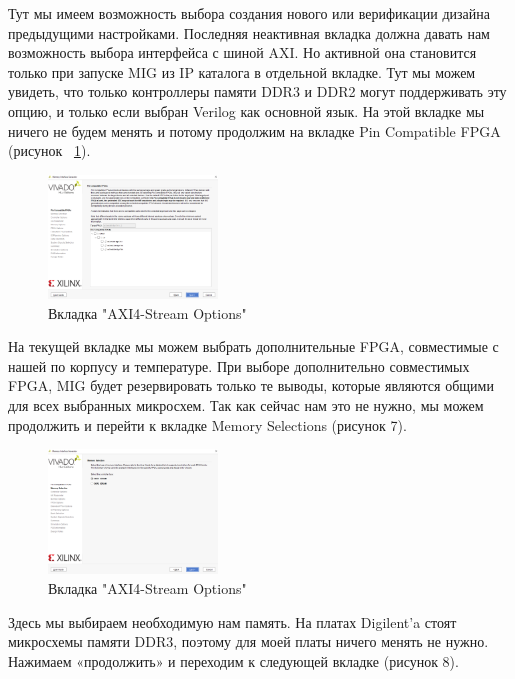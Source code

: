 \documentclass[a4paper,oneside ,10pt]{extreport}
\begin{document}
Тут мы имеем возможность выбора создания нового или верификации дизайна предыдущими настройками. Последняя неактивная вкладка должна давать нам возможность выбора интерфейса с шиной AXI. Но активной она становится только при запуске MIG из IP каталога в отдельной вкладке. Тут мы можем увидеть, что только контроллеры памяти DDR3 и DDR2 могут поддерживать эту опцию, и только если выбран Verilog как основной язык. На этой вкладке мы ничего не будем менять и потому продолжим на вкладке Pin Compatible FPGA (рисунок ~\ref{mig_2}).

\begin{figure}[h]
	\centering
	\includegraphics[width=0.4\textwidth]{image/mig_2.png}
	\caption{Вкладка "AXI4-Stream Options"}
	\label{mig_2}
\end{figure}

На текущей вкладке мы можем выбрать дополнительные FPGA, совместимые с нашей по корпусу и температуре. При выборе дополнительно совместимых FPGA, MIG будет резервировать только те выводы, которые являются общими для всех выбранных микросхем. Так как сейчас нам это не нужно, мы можем продолжить и перейти к вкладке Memory Selections (рисунок 7).

\begin{figure}[h]
	\centering
	\includegraphics[width=0.4\textwidth]{image/mig_3.png}
	\caption{Вкладка "AXI4-Stream Options"}
	\label{cordic_axi4_stream_options}
\end{figure}

Здесь мы выбираем необходимую нам память. На платах Digilent’a стоят микросхемы памяти DDR3, поэтому для моей платы ничего менять не нужно. Нажимаем «продолжить» и переходим к следующей вкладке (рисунок 8).
\end{document}
